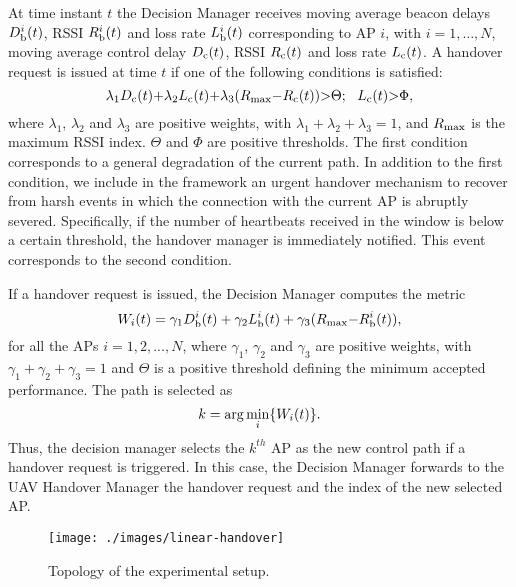 At time instant $t$ the Decision Manager receives moving average beacon delays $D^{i}_{\rm b}(t)$, RSSI $R^{i}_{\rm b}(t)$ and loss rate $L^i_{\rm b}(t)$ corresponding to AP $i$, with $i=1,\ldots,N$, moving average control delay $D_{\rm c}(t)$, RSSI $R_{\rm c}(t)$ and loss rate $L_{\rm c}(t)$.
A handover request is issued at time $t$ if one of the following conditions is satisfied:
\vspace{-1.5mm}
\begin{equation}
 \lambda_1  D_{\rm c}(t) {+} \lambda_2  L_{\rm c}(t) {+} \lambda_3 (R_{\rm max}{-}R_{\rm c}(t))  {>} \Theta;~~
 L_{\rm c}(t){>} \Phi,
\vspace{-1mm}
\end{equation}
where $\lambda_1$, $\lambda_2$ and $\lambda_3$ are positive weights, with $\lambda_1{+}\lambda_2{+}\lambda_3{=}1$, and $R_{\rm max}$ is the maximum RSSI index. $\Theta$ and $\Phi$ are positive thresholds. The first condition corresponds to a general degradation of the current path. In addition to the first condition, we include in the framework an urgent handover mechanism to recover from harsh events in which the connection with the current AP is abruptly severed. Specifically, if the number of heartbeats received in the window is below a certain threshold, the handover manager is immediately notified. This event corresponds to the second condition.

If a handover request is issued, the Decision Manager computes
the metric
\begin{equation}
W_{i}(t) =  \gamma_1  D^{i}_{\rm b}(t) + \gamma_2  L^{i}_{\rm b}(t) + \gamma_3 (R_{\rm max}{-}R^{i}_{\rm b}(t)),
\end{equation}
for all the APs $i=1,2,...,N$, where $\gamma_1$, $\gamma_2$ and $\gamma_3$ are positive weights, with $\gamma_1{+}\gamma_2{+}\gamma_3{=}1$ and $\Theta$ is a positive threshold defining the minimum accepted performance.
The path is selected as
\vspace{-2mm}
\begin{equation}
	k = \arg \min_{i}\{W_{i}(t)\}.
\vspace{-2mm}
\end{equation}
Thus, the decision manager selects the $k^{th}$ AP as the new control path if a handover request is triggered. In this case, the Decision Manager forwards to the UAV Handover Manager the handover request and the index of the new selected AP. 


\begin{figure}[!t]
   \centering
   \texttt{[image: ./images/linear-handover]}
    \vspace{-6mm}
    \caption{Topology of the experimental setup.}
    \vspace{-6mm}
    \label{fig:linear-sense}
\end{figure}

